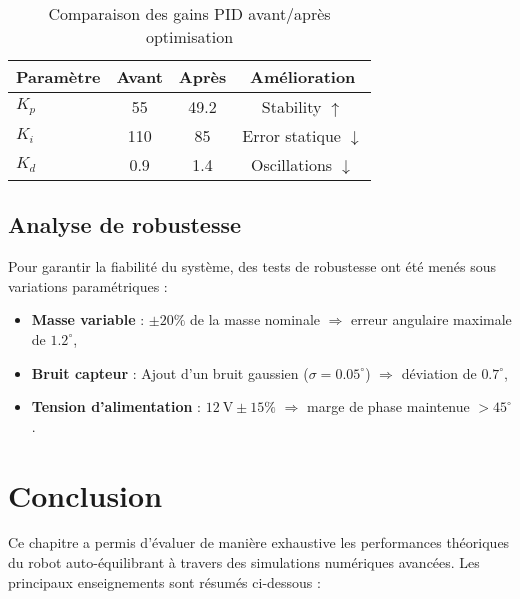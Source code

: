 \documentclass{report}
\begin{document}
\begin{table}[htbp]
    \centering
    \caption{Comparaison des gains PID avant/après optimisation}
    \label{tab:pid_gains}
    \begin{tabular}{|l|c|c|c|}
        \hline
        \textbf{Paramètre} & \textbf{Avant} & \textbf{Après} & \textbf{Amélioration} \\
        \hline
        $K_p$ & 55 & 49.2 & Stability $\uparrow$ \\
        $K_i$ & 110 & 85 & Error statique $\downarrow$ \\
        $K_d$ & 0.9 & 1.4 & Oscillations $\downarrow$ \\
        \hline
    \end{tabular}
\end{table}

\subsection{Analyse de robustesse}
\label{subsec:robustesse}

Pour garantir la fiabilité du système, des tests de robustesse ont été menés sous variations paramétriques :

\begin{itemize}
    \item \textbf{Masse variable} : $\pm 20\%$ de la masse nominale $\Rightarrow$ erreur angulaire maximale de $1.2^\circ$,
    \item \textbf{Bruit capteur} : Ajout d'un bruit gaussien ($\sigma = 0.05^\circ$) $\Rightarrow$ déviation de $0.7^\circ$,
    \item \textbf{Tension d'alimentation} : $12\ \text{V} \pm 15\%$ $\Rightarrow$ marge de phase maintenue $> 45^\circ$.
\end{itemize}

\section*{Conclusion }

Ce chapitre a permis d'évaluer de manière exhaustive les performances théoriques du robot auto-équilibrant à travers des simulations numériques avancées. Les principaux enseignements sont résumés ci-dessous :
\end{document}
